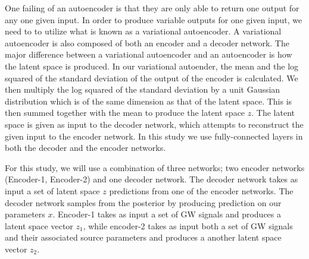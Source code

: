 \documentclass[%
showpacs,
 amsmath,amssymb,
 aps,
 twocolumn,
 prl,
 reprint,
floatfix,
]{revtex4-1}
\begin{document}
%
%
One failing of an autoencoder is that they are only able to return one 
output for any one given input. In order to produce variable outputs for 
one given input, we need to to utilize what is known as a variational autoencoder.
A variational autoencoder is also composed of both an encoder and a decoder network. 
The major difference between a variational autoencoder and an autoencoder is how the 
latent space is produced. In our variational autoender, the mean and the log squared 
of the standard deviation of the output of the encoder is calculated. We then multiply 
the log squared of the standard deviation by a unit Gaussian distribution which is 
of the same dimension as that of the latent space. This is then summed together 
with the mean to produce the latent space $z$. The latent space is given as input 
to the decoder network, which attempts to reconstruct the given input to 
the encoder network. In this study we use fully-connected layers in 
both the decoder and the encoder networks.

%
%
For this study, we will use a combination of three networks; two encoder networks (Encoder-1, Encoder-2) 
and one decoder network. The decoder network takes as input a set of latent space 
$z$ predictions from one of the encoder networks. The decoder network samples from 
the posterior by producing prediction on our parameters $x$. Encoder-1 takes as 
input a set of GW signals and produces a latent space vector $z_1$, while encoder-2 
takes as input both a set of GW signals and their associated source parameters 
and produces a another latent space vector $z_2$.
\end{document}
